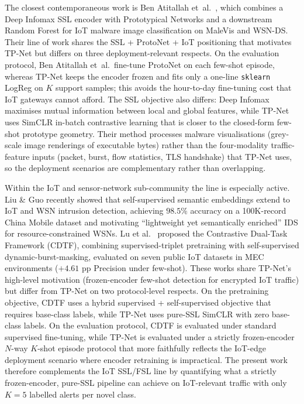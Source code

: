 \documentclass[sensors,article,submit,moreauthors]{Definitions/mdpi}
\begin{document}
The closest contemporaneous work is Ben Atitallah et~al.\ \cite{atitallah2024iot}, which combines a Deep Infomax SSL encoder with Prototypical Networks and a downstream Random Forest for IoT malware image classification on MaleVis and WSN-DS. Their line of work shares the SSL + ProtoNet + IoT positioning that motivates TP-Net but differs on three deployment-relevant respects. On the evaluation protocol, Ben Atitallah et~al.\ fine-tune ProtoNet on each few-shot episode, whereas TP-Net keeps the encoder frozen and fits only a one-line \texttt{sklearn} LogReg on $K$ support samples; this avoids the hour-to-day fine-tuning cost that IoT gateways cannot afford. The SSL objective also differs: Deep Infomax maximises mutual information between local and global features, while TP-Net uses SimCLR in-batch contrastive learning that is closer to the closed-form few-shot prototype geometry. Their method processes malware visualisations (grey-scale image renderings of executable bytes) rather than the four-modality traffic-feature inputs (packet, burst, flow statistics, TLS handshake) that TP-Net uses, so the deployment scenarios are complementary rather than overlapping.

Within the IoT and sensor-network sub-community the line is especially active. Liu \& Guo \cite{liu2025iot} recently showed that self-supervised semantic embeddings extend to IoT and WSN intrusion detection, achieving $98.5\%$ accuracy on a 100K-record China Mobile dataset and motivating ``lightweight yet semantically enriched'' IDS for resource-constrained WSNs. Lu et al.\ \cite{lu2026cdtf} proposed the Contrastive Dual-Task Framework (CDTF), combining supervised-triplet pretraining with self-supervised dynamic-burst-masking, evaluated on seven public IoT datasets in MEC environments ($+4.61$ pp Precision under few-shot). These works share TP-Net's high-level motivation (frozen-encoder few-shot detection for encrypted IoT traffic) but differ from TP-Net on two protocol-level respects. On the pretraining objective, CDTF uses a hybrid supervised + self-supervised objective that requires base-class labels, while TP-Net uses pure-SSL SimCLR with zero base-class labels. On the evaluation protocol, CDTF is evaluated under standard supervised fine-tuning, while TP-Net is evaluated under a strictly frozen-encoder $N$-way $K$-shot episode protocol that more faithfully reflects the IoT-edge deployment scenario where encoder retraining is impractical. The present work therefore complements the IoT SSL/FSL line by quantifying what a strictly frozen-encoder, pure-SSL pipeline can achieve on IoT-relevant traffic with only $K = 5$ labelled alerts per novel class.
\end{document}
